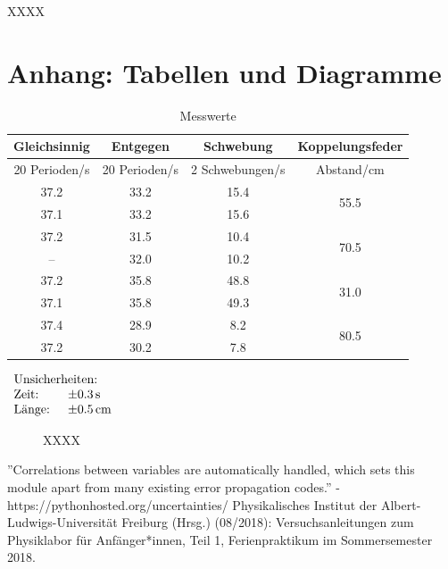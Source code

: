 \documentclass[11pt,a4paper]{article}
\begin{document}
XXXX

\pagebreak

\section{Anhang: Tabellen und Diagramme}

\begin{table}[h]
\centering
\caption{Messwerte} \vspace{11pt}

\begin{tabular}{cccc}
\textrm{Gleichsinnig} & \textrm{Entgegen} & \textrm{Schwebung} & \textrm{Koppelungsfeder}\\
\toprule
\textrm{20 Perioden}/\textrm{s} & \textrm{20 Perioden}/\textrm{s} & \textrm{2 Schwebungen}/\textrm{s} & \textrm{Abstand}/\textrm{cm}\\
\midrule 
37.2 & 33.2 & 15.4 & \multirow{2}{*}{55.5}\\
37.1 & 33.2 & 15.6 &\\
\hline 
37.2 & 31.5 & 10.4 & \multirow{2}{*}{70.5}\\
 --  & 32.0 & 10.2 &\\
\hline 
37.2 & 35.8 & 48.8 & \multirow{2}{*}{31.0}\\ 
37.1 & 35.8 & 49.3 &\\ 
\hline
37.4 & 28.9 & \phantom{0}8.2 & \multirow{2}{*}{80.5}\\
37.2 & 30.2 & \phantom{0}7.8 &\\ 
\bottomrule
\end{tabular}
$\begin{array}{ll}
\multicolumn{2}{l}{\textrm{Unsicherheiten:}}\\
\textrm{Zeit: } & \pm 0.3\, \textrm{s}\\
\textrm{Länge: } & \pm 0.5\, \textrm{cm}\\
\end{array}$
\label{Tab:1}
\end{table}

\begin{figure}[p]
\centering
\renewcommand\thefigure{BX}
\caption[XXXX]{XXXX}
\label{Abb:X}
\end{figure}

\begin{thebibliography}{9}
''Correlations between variables are automatically handled, which sets this module apart from many existing error propagation codes.'' - https://pythonhosted.org/uncertainties/
 Physikalisches Institut der Albert-Ludwigs-Universität Freiburg (Hrsg.) (08/2018): Versuchsanleitungen zum Physiklabor für Anfänger*innen, Teil 1, Ferienpraktikum im Sommersemester 2018.
\end{thebibliography}
\end{document}
